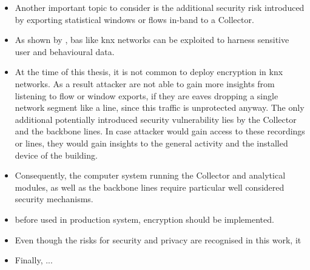 \begin{itemize}
	\item Another important topic to consider is the additional security risk introduced by exporting statistical windows or flows in-band to a Collector.
	\item As shown by \textcite{Mundt2012}, \gls{bas} like \gls{knx} networks can be exploited to harness sensitive user and behavioural data.
	\item At the time of this thesis, it is not common to deploy encryption in \gls{knx} networks. As a result attacker are not able to gain more insights from listening to flow or window exports, if they are eaves dropping a single network segment like a line, since this traffic is unprotected anyway. The only additional potentially introduced security vulnerability lies by the Collector and the backbone lines. In case attacker would gain access to these recordings or lines, they would gain insights to the general activity and the installed device of the building.
	\item Consequently, the computer system running the Collector and analytical modules, as well as the backbone lines require particular well considered security mechanisms.
	\item before used in production system, encryption should be implemented.
	\item Even though the risks for security and privacy are recognised in this work, it 
	
	\item Finally, ...
	
	
\end{itemize}
